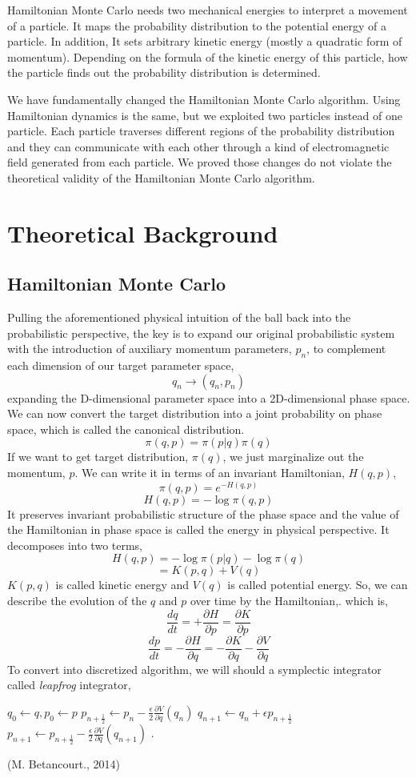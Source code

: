 \documentclass{article}
\begin{document}
Hamiltonian Monte Carlo needs two mechanical energies to interpret a movement of a particle. It maps the probability distribution to the potential energy of a particle. In addition, It sets arbitrary kinetic energy (mostly a quadratic form of momentum). Depending on the formula of the kinetic energy of this particle, how the particle finds out the probability distribution is determined.

We have fundamentally changed the Hamiltonian Monte Carlo algorithm. Using Hamiltonian dynamics is the same, but we exploited two particles instead of one particle. Each particle traverses different regions of the probability distribution and they can communicate with each other through a kind of electromagnetic field generated from each particle. We proved those changes do not violate the theoretical validity of the Hamiltonian Monte Carlo algorithm.

\section{Theoretical Background}
\subsection{Hamiltonian Monte Carlo}
Pulling the aforementioned physical intuition of the ball back into the probabilistic perspective, the key is to expand our original probabilistic system with the introduction of auxiliary momentum parameters, $p_{n}$, to complement each dimension of our target parameter space,
\[
q_{n} \rightarrow (q_{n}, p_{n})
\]
expanding the D-dimensional parameter space into a 2D-dimensional phase space. We can now convert the target distribution into a joint probability on phase space, which is called the canonical distribution.
\[
\pi(q,p) = \pi(p|q)\pi(q)
\]
If we want to get target distribution, $\pi(q)$, we just marginalize out the momentum, $p$.
We can write it in terms of an invariant Hamiltonian, $H(q,p)$,
\[
\pi(q,p) = e^{-H(q,p)}
\]
\[
H(q,p) = -\log\pi(q,p)
\]
It preserves invariant probabilistic structure of the phase space and the value of the Hamiltonian in phase space is called the energy in physical perspective. It decomposes into two terms,
\[
H(q,p) = -\log\pi(p | q) - \log\pi(q)
\]
\[
        =       K(p,q)    +  V(q)
\]
$K(p,q)$ is called kinetic energy and $V(q)$ is called potential energy. So, we can describe the evolution of the $q$ and $p$ over time by the Hamiltonian,. which is,
\[
\frac{dq}{dt} = +\frac{\partial H}{\partial p} = \frac{\partial K}{\partial p}
\]
\[
\frac{dp}{dt} = -\frac{\partial H}{\partial q} = -\frac{\partial K}{\partial q} - \frac{\partial V}{\partial q}
\]
To convert into discretized algorithm, we will should a symplectic integrator called \textit{leapfrog} integrator,
\begin{algorithmic}
\STATE $q_0 \leftarrow q, p_0 \leftarrow p$
\STATE $p_{n+\frac{1}{2}} \leftarrow p_{n} - \frac{\epsilon}{2}\frac{\partial V}{\partial q}(q_{n})$
\STATE $q_{n+1} \leftarrow q_{n} + \epsilon p_{n+\frac{1}{2}}$
\STATE $p_{n+1} \leftarrow p_{n+\frac{1}{2}} - \frac{\epsilon}{2}\frac{\partial V}{\partial q}(q_{n+1})$
\ENDFOR.
\end{algorithmic}
(M. Betancourt., 2014)
\end{document}

